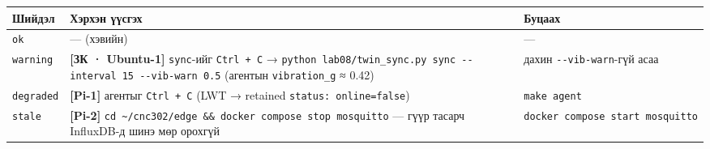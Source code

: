\begingroup\scriptsize\begin{longtable}[]{@{}lll@{}}
\toprule
\begin{minipage}[b]{0.30\columnwidth}\raggedright
Шийдэл\strut
\end{minipage} & \begin{minipage}[b]{0.30\columnwidth}\raggedright
Хэрхэн үүсгэх\strut
\end{minipage} & \begin{minipage}[b]{0.30\columnwidth}\raggedright
Буцаах\strut
\end{minipage}\tabularnewline
\midrule
\endhead
\begin{minipage}[t]{0.30\columnwidth}\raggedright
\texttt{ok}\strut
\end{minipage} & \begin{minipage}[t]{0.30\columnwidth}\raggedright
--- (хэвийн)\strut
\end{minipage} & \begin{minipage}[t]{0.30\columnwidth}\raggedright
---\strut
\end{minipage}\tabularnewline
\begin{minipage}[t]{0.30\columnwidth}\raggedright
\texttt{warning}\strut
\end{minipage} & \begin{minipage}[t]{0.30\columnwidth}\raggedright
\textbf{{[}ЗК · Ubuntu-1{]}} \texttt{sync}-ийг \texttt{Ctrl\ +\ C} → \texttt{python\ lab08/\allowbreak{}twin\_\allowbreak{}sync.\allowbreak{}py\ sync\ -\/\allowbreak{}-interval\ 15\ -\/\allowbreak{}-vib-warn\ 0.\allowbreak{}5} (агентын \texttt{vibration\_g} ≈ 0.42)\strut
\end{minipage} & \begin{minipage}[t]{0.30\columnwidth}\raggedright
дахин \texttt{-\/-vib-warn}-гүй асаа\strut
\end{minipage}\tabularnewline
\begin{minipage}[t]{0.30\columnwidth}\raggedright
\texttt{degraded}\strut
\end{minipage} & \begin{minipage}[t]{0.30\columnwidth}\raggedright
\textbf{{[}Pi-1{]}} агентыг \texttt{Ctrl\ +\ C} (LWT → retained \texttt{status:\allowbreak{}\ online=\allowbreak{}false})\strut
\end{minipage} & \begin{minipage}[t]{0.30\columnwidth}\raggedright
\texttt{make\ agent}\strut
\end{minipage}\tabularnewline
\begin{minipage}[t]{0.30\columnwidth}\raggedright
\texttt{stale}\strut
\end{minipage} & \begin{minipage}[t]{0.30\columnwidth}\raggedright
\textbf{{[}Pi-2{]}} \texttt{cd\ \textasciitilde{}/cnc302/edge\ \&\&\ docker\ compose\ stop\ mosquitto} --- гүүр тасарч InfluxDB-д шинэ мөр орохгүй\strut
\end{minipage} & \begin{minipage}[t]{0.30\columnwidth}\raggedright
\texttt{docker\ compose\ start\ mosquitto}\strut
\end{minipage}\tabularnewline
\bottomrule
\end{longtable}\endgroup

